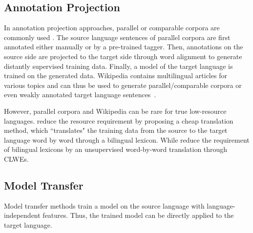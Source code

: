 \documentclass[11pt,a4paper]{article}
\begin{document}
	\subsection{Annotation Projection}
	\label{sec:annotation_projection}
	In annotation projection approaches, parallel or comparable corpora are commonly used \cite{yarowsky2001inducing,ehrmann11building,das2011unsupervised,li12joint,tackstrom2013token,wang14cross,ni17weakly}. The source language sentences of parallel corpora are first annotated either manually or by a pre-trained tagger. Then, annotations on the source side are projected to the target side through word alignment to generate distantly supervised training data. Finally, a model of the target language is trained on the generated data. Wikipedia contains multilingual articles for various topics and can thus be used to generate parallel/comparable corpora or even weakly annotated target language sentences~\cite{kim12multilingual}.
	
	However, parallel corpora and Wikipedia can be rare for true low-resource languages.  reduce the resource requirement by proposing a cheap translation method, which ``translates" the training data from the source to the target language word by word through a bilingual lexicon. While  reduce the requirement of bilingual lexicons by an unsupervised word-by-word translation through CLWEs.
	
	\subsection{Model Transfer}
	\label{sec:model_transfer}
	Model transfer methods train a model on the source language with language-independent features. Thus, the trained model can be directly applied to the target language.
	
\end{document}
